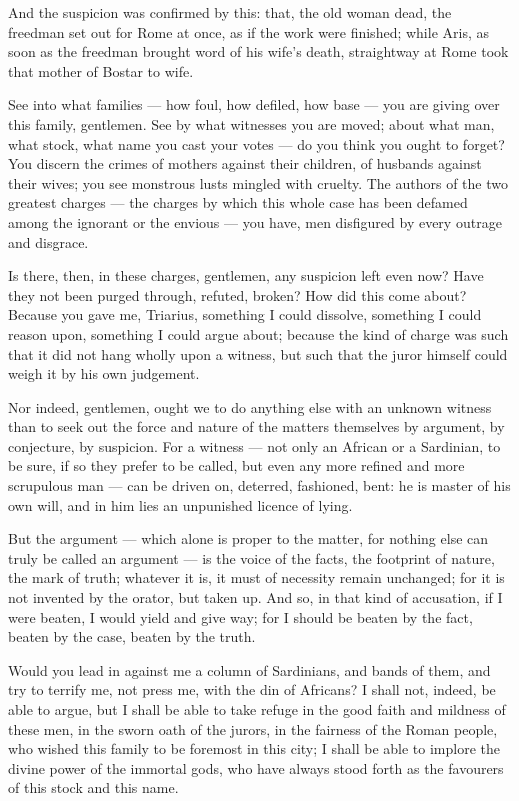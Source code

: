  And the suspicion was confirmed by this: that, the old woman dead, the freedman set out for Rome at once, as if the work were finished; while Aris, as soon as the freedman brought word of his wife's death, straightway at Rome took that mother of Bostar to wife.

 See into what families --- how foul, how defiled, how base --- you are giving over this family, gentlemen. See by what witnesses you are moved; about what man, what stock, what name you cast your votes --- do you think you ought to forget? You discern the crimes of mothers against their children, of husbands against their wives; you see monstrous lusts mingled with cruelty. The authors of the two greatest charges --- the charges by which this whole case has been defamed among the ignorant or the envious --- you have, men disfigured by every outrage and disgrace.

 Is there, then, in these charges, gentlemen, any suspicion left even now? Have they not been purged through, refuted, broken? How did this come about? Because you gave me, Triarius, something I could dissolve, something I could reason upon, something I could argue about; because the kind of charge was such that it did not hang wholly upon a witness, but such that the juror himself could weigh it by his own judgement.

 Nor indeed, gentlemen, ought we to do anything else with an unknown witness than to seek out the force and nature of the matters themselves by argument, by conjecture, by suspicion. For a witness --- not only an African or a Sardinian, to be sure, if so they prefer to be called, but even any more refined and more scrupulous man --- can be driven on, deterred, fashioned, bent: he is master of his own will, and in him lies an unpunished licence of lying.

 But the argument --- which alone is proper to the matter, for nothing else can truly be called an argument --- is the voice of the facts, the footprint of nature, the mark of truth; whatever it is, it must of necessity remain unchanged; for it is not invented by the orator, but taken up. And so, in that kind of accusation, if I were beaten, I would yield and give way; for I should be beaten by the fact, beaten by the case, beaten by the truth.

 Would you lead in against me a column of Sardinians, and bands of them, and try to terrify me, not press me, with the din of Africans? I shall not, indeed, be able to argue, but I shall be able to take refuge in the good faith and mildness of these men, in the sworn oath of the jurors, in the fairness of the Roman people, who wished this family to be foremost in this city; I shall be able to implore the divine power of the immortal gods, who have always stood forth as the favourers of this stock and this name.


